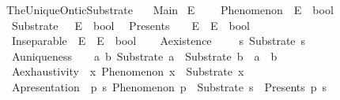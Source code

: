 %
\begin{isabellebody}%
%
%
\isadelimtheory
%
\endisadelimtheory
%
\isatagtheory
{}\isamarkupfalse%
\ The{\isacharunderscore}{\kern0pt}Unique{\isacharunderscore}{\kern0pt}Ontic{\isacharunderscore}{\kern0pt}Substrate\isanewline
\ \ \ Main\isanewline
{}%
\endisatagtheory
{\isafoldtheory}%
%
\isadelimtheory
%
\endisadelimtheory
%
\isadelimdocument
%
\endisadelimdocument
%
\isatagdocument
%
\isamarkuptrue%
%
\endisatagdocument
{\isafolddocument}%
%
\isadelimdocument
%
\endisadelimdocument
{}\isamarkupfalse%
\ E\ \ \isanewline
\isanewline
{}\isamarkupfalse%
\isanewline
\ \ Phenomenon\ {\isacharcolon}{\kern0pt}{\isacharcolon}{\kern0pt}\ {\isachardoublequoteopen}E\ {\isasymRightarrow}\ bool{\isachardoublequoteclose}\isanewline
\ \ Substrate\ \ {\isacharcolon}{\kern0pt}{\isacharcolon}{\kern0pt}\ {\isachardoublequoteopen}E\ {\isasymRightarrow}\ bool{\isachardoublequoteclose}\isanewline
\ \ Presents\ \ \ {\isacharcolon}{\kern0pt}{\isacharcolon}{\kern0pt}\ {\isachardoublequoteopen}E\ {\isasymRightarrow}\ E\ {\isasymRightarrow}\ bool{\isachardoublequoteclose}\ \ \ \isanewline
\ \ Inseparable\ {\isacharcolon}{\kern0pt}{\isacharcolon}{\kern0pt}\ {\isachardoublequoteopen}E\ {\isasymRightarrow}\ E\ {\isasymRightarrow}\ bool{\isachardoublequoteclose}\isanewline
\isanewline
{}\isamarkupfalse%
\ \isanewline
\ \ A{}{\isacharunderscore}{\kern0pt}existence{\isacharcolon}{\kern0pt}\ \ \ \ \ {\isachardoublequoteopen}{\isasymexists}s{\isachardot}{\kern0pt}\ Substrate\ s{\isachardoublequoteclose}\ \isanewline
\ \ A{}{\isacharunderscore}{\kern0pt}uniqueness{\isacharcolon}{\kern0pt}\ \ \ \ {\isachardoublequoteopen}{\isasymforall}a\ b{\isachardot}{\kern0pt}\ Substrate\ a\ {\isasymlongrightarrow}\ Substrate\ b\ {\isasymlongrightarrow}\ a\ {\isacharequal}{\kern0pt}\ b{\isachardoublequoteclose}\ \isanewline
\ \ A{}{\isacharunderscore}{\kern0pt}exhaustivity{\isacharcolon}{\kern0pt}\ \ {\isachardoublequoteopen}{\isasymforall}x{\isachardot}{\kern0pt}\ Phenomenon\ x\ {\isasymor}\ Substrate\ x{\isachardoublequoteclose}\ \isanewline
\ \ A{}{\isacharunderscore}{\kern0pt}presentation{\isacharcolon}{\kern0pt}\ \ {\isachardoublequoteopen}{\isasymforall}p\ s{\isachardot}{\kern0pt}\ Phenomenon\ p\ {\isasymand}\ Substrate\ s\ {\isasymlongrightarrow}\ Presents\ p\ s{\isachardoublequoteclose}\ \isanewline

\end{isabellebody}
